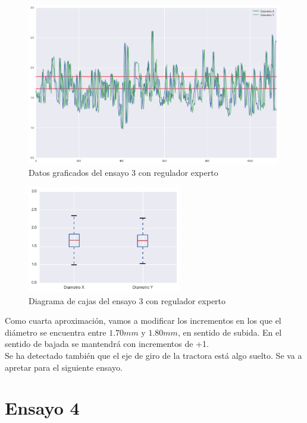 \begin{figure}[H]
    \centering
    \includegraphics[width=0.99\textwidth]{images/producciones/12082015/output_9_e2.png}
    \caption{Datos graficados del ensayo 3 con regulador experto}
    \label{fig:reg_graf3}
\end{figure}

\begin{figure}[H]
    \centering
    \includegraphics[width=0.6\textwidth]{images/producciones/12082015/output_10_e2.png}
    \caption{Diagrama de cajas del ensayo 3 con regulador experto}
    \label{fig:reg_cajas3}
\end{figure}

Como cuarta  aproximación, vamos a  modificar los incrementos en los que el diámetro se encuentra entre $1.70 mm$ y $1.80 mm$, en sentido de subida. En el sentido de bajada se mantendrá con incrementos de +1.\\

Se ha detectado también que el eje de giro de la tractora está algo suelto. Se va a apretar para el siguiente ensayo.\\

\section{Ensayo 4}

